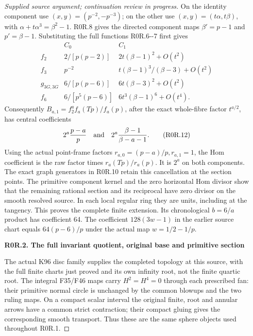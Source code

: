 \begin{proof}[Supplied source argument; continuation review in progress]
On the identity component use \((x,y)=(p^{-2},-p^{-3})\); on the
other use \((x,y)=(t\alpha,t\beta)\), with
\(\alpha+t\alpha^3=\beta^2-1\). R0R.8 gives the directed component
maps \(\beta'=p-1\) and \(p'=\beta-1\). Substituting the full
functions R0R.6-\/-7 first gives
\[
 \begin{array}{c|cc}
 &C_0&C_1\\\hline
 f_2&2/[p(p-2)]&2t(\beta-1)^2+O(t^2)\\
 f_3&p^{-2}&t(\beta-1)^3/(\beta-3)+O(t^2)\\
 g_{3G,3G}&6/[p(p-6)]&6t(\beta-3)^2+O(t^2)\\
 f_6&6/[p^5(p-6)]&6t^3(\beta-1)^6+O(t^4).
 \end{array}                                                       \tag{R0R.11}
\]
Consequently \(B_{a,1}=f_2^a f_a(Tp)/f_a(p)\), after the exact
whole-fibre factor \(t^{a/2}\), has central coefficients
\[
 2^a\frac{p-a}p\quad\hbox{and}\quad
 2^a\frac{\beta-1}{\beta-a-1}.                   \tag{R0R.12}
\]
Using the actual point-frame factors \(r_{a,0}=(p-a)/p,r_{a,1}=1\),
the Hom coefficient is the raw factor times \(r_a(Tp)/r_a(p)\).
It is \(2^a\) on both components. The exact graph generators in
R0R.10 retain this cancellation at the section points. The primitive
component kernel and the zero horizontal Hom divisor show that the
remaining rational section and its reciprocal have zero divisor on
the smooth resolved source. In each local regular ring they are
units, including at the tangency. This proves the complete finite
extension. Its chronological \(b=6/a\) product has coefficient 64.
The coefficient \(128(3w-1)\) in the earlier source chart equals
\(64(p-6)/p\) under the actual map \(w=1/2-1/p\).

\par

\medskip\noindent\textbf{R0R.2. The full invariant quotient, original base and primitive section}

\par\nobreak

The actual K96 disc family supplies the completed topology at this
source, with the full finite charts just proved and its own infinity
root, not the finite quartic root. The integral F35/F46 maps carry
\(H^2=H^4=0\) through each prescribed fan: their primitive normal
circle is unchanged by the common blowups and the two ruling maps.
On a compact scalar interval the original finite, root and annular
arrows have a common strict contraction; their compact gluing gives
the corresponding smooth transport. Thus these are the same sphere
objects used throughout R0R.1.


\end{proof}
